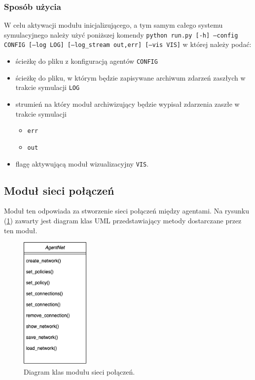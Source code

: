\documentclass{article}
\begin{document}
\subsubsection{Sposób użycia}

W celu aktywacji modułu inicjalizującego, a tym samym całego systemu symulacyjnego należy użyć poniższej komendy 
\newline
\texttt{python run.py [-h] --config CONFIG [--log LOG] [--log\_stream {out,err}] [--vis VIS]}
\newline
w której należy podać:

\begin{itemize}
	\item ścieżkę do pliku z konfiguracją agentów \texttt{CONFIG}
	\item ścieżkę do pliku, w którym będzie zapisywane archiwum zdarzeń zaszłych w trakcie symulacji \texttt{LOG}
	\item strumień na który moduł archiwizujący będzie wypisał zdarzenia zaszłe w trakcie symulacji  
		\begin{itemize}
			\item \texttt{err}
			\item \texttt{out}
		\end{itemize}
	\item flagę aktywującą moduł wizualizacyjny \texttt{VIS}.
\end{itemize}
\subsection{Moduł sieci połączeń}
Moduł ten odpowiada za stworzenie sieci połączeń między agentami. Na rysunku (\ref{uml-net}) zawarty jest diagram 
klas UML przedstawiający metody dostarczane przez ten moduł.

\begin{figure}[H]
	\centering
	\includegraphics[width=0.3\textwidth, height=0.3\textheight]{./net-uml.png}
	\caption{Diagram klas modułu sieci połączeń.}
	\label{uml-net}
\end{figure}
\end{document}
